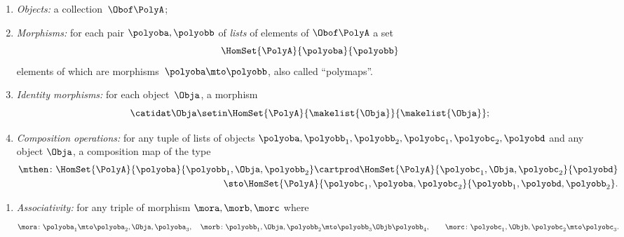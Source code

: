 \begin{ctdefinition}[Polycategory]
    \constit
    \begin{enumerate}
        \item \emph{Objects:} a collection~$\Obof\PolyA$;
        \item \emph{Morphisms:} for each pair $\polyoba, \polyobb$ of \emph{lists} of elements of $\Obof\PolyA$
              a set
              \begin{equation}
                  \HomSet{\PolyA}{\polyoba}{\polyobb}
              \end{equation}
              elements of which are morphisms~$\polyoba \mto \polyobb$,
              also called ``polymaps''.
        \item \emph{Identity morphisms:} for each object~$\Obja$, a morphism
              \begin{equation}
                  \catidat\Obja \setin \HomSet{\PolyA}{\makelist{\Obja}}{\makelist{\Obja}};
              \end{equation}
        \item \emph{Composition operations:} for any tuple of lists of objects
              $\polyoba, \polyobb_1, \polyobb_2, \polyobc_1, \polyobc_2, \polyobd$ and any object $\Obja$,
              a composition map of the type
              \begin{equation}
                  \begin{aligned}
                      \mthen \colon \HomSet{\PolyA}{\polyoba}{\polyobb_1,\Obja,\polyobb_2}
                      \cartprod
                      \HomSet{\PolyA}{\polyobc_1,\Obja,\polyobc_2}{\polyobd} \\
                      \sto
                      \HomSet{\PolyA}{\polyobc_1,\polyoba,\polyobc_2}{\polyobb_1,\polyobd,\polyobb_2}.
                  \end{aligned}
              \end{equation}
    \end{enumerate}
    \condit
    \begin{enumerate}
        \item \emph{Associativity:} for any triple of morphism $\mora,\morb,\morc$ where
              \begin{equation}
                  \mora \colon \polyoba_1 \mto \polyoba_2,\Obja,\polyoba_3,
                  \quad
                  \morb  \colon \polyobb_1 , \Obja,  \polyobb_2 \mto \polyobb_3 \Objb \polyobb_4,
                  \qquad
                  \morc \colon \polyobc_1 , \Objb ,  \polyobc_2 \mto \polyobc_3.
              \end{equation}

\end{enumerate}
\end{ctdefinition}
